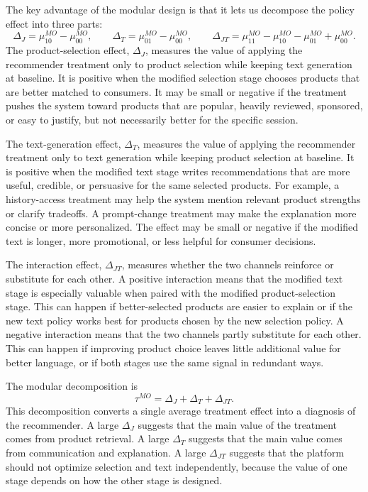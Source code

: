 \documentclass[11pt]{article}
\begin{document}
The key advantage of the modular design is that it lets us decompose the policy effect into three parts:
\begin{equation}
\Delta_J = \mu_{10}^{MO} - \mu_{00}^{MO}, \qquad \Delta_T = \mu_{01}^{MO} - \mu_{00}^{MO}, \qquad \Delta_{JT} = \mu_{11}^{MO} - \mu_{10}^{MO} - \mu_{01}^{MO} + \mu_{00}^{MO}.
\label{eq:component-effects}
\end{equation}
The product-selection effect, $\Delta_J$, measures the value of applying the recommender treatment only to product selection while keeping text generation at baseline. It is positive when the modified selection stage chooses products that are better matched to consumers. It may be small or negative if the treatment pushes the system toward products that are popular, heavily reviewed, sponsored, or easy to justify, but not necessarily better for the specific session.

The text-generation effect, $\Delta_T$, measures the value of applying the recommender treatment only to text generation while keeping product selection at baseline. It is positive when the modified text stage writes recommendations that are more useful, credible, or persuasive for the same selected products. For example, a history-access treatment may help the system mention relevant product strengths or clarify tradeoffs. A prompt-change treatment may make the explanation more concise or more personalized. The effect may be small or negative if the modified text is longer, more promotional, or less helpful for consumer decisions.

The interaction effect, $\Delta_{JT}$, measures whether the two channels reinforce or substitute for each other. A positive interaction means that the modified text stage is especially valuable when paired with the modified product-selection stage. This can happen if better-selected products are easier to explain or if the new text policy works best for products chosen by the new selection policy. A negative interaction means that the two channels partly substitute for each other. This can happen if improving product choice leaves little additional value for better language, or if both stages use the same signal in redundant ways.

The modular decomposition is
\begin{equation}
\tau^{MO} = \Delta_J + \Delta_T + \Delta_{JT}.
\label{eq:modular-decomposition}
\end{equation}
This decomposition converts a single average treatment effect into a diagnosis of the recommender. A large $\Delta_J$ suggests that the main value of the treatment comes from product retrieval. A large $\Delta_T$ suggests that the main value comes from communication and explanation. A large $\Delta_{JT}$ suggests that the platform should not optimize selection and text independently, because the value of one stage depends on how the other stage is designed.
\end{document}
